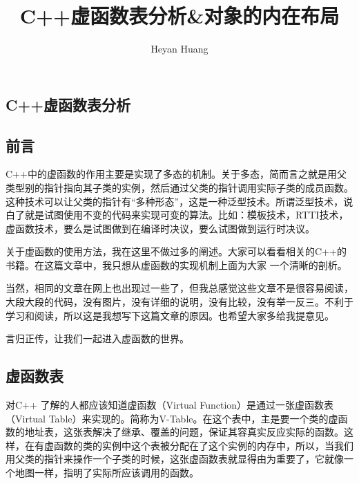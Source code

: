 \documentclass{article}
\title{C++虚函数表分析\&对象的内在布局}
\author{Heyan Huang}
\begin{document}
\begin{CJK}{UTF8}{gbsn}
\maketitle


\small{}

\lstset{language=c++,
numbers=left, 
numberstyle=\tiny, 
escapeinside=``, 
extendedchars=false %
}

\section{C++虚函数表分析}

\subsection{前言}
C++中的虚函数的作用主要是实现了多态的机制。关于多态，简而言之就是用父类型别的指针指向其子类的实例，然后通过父类的指针调用实际子类的成员函数。这种技术可以让父类的指针有“多种形态”，这是一种泛型技术。所谓泛型技术，说白了就是试图使用不变的代码来实现可变的算法。比如：模板技术，RTTI技术，虚函数技术，要么是试图做到在编译时决议，要么试图做到运行时决议。
 
关于虚函数的使用方法，我在这里不做过多的阐述。大家可以看看相关的C++的书籍。在这篇文章中，我只想从虚函数的实现机制上面为大家 一个清晰的剖析。
 
当然，相同的文章在网上也出现过一些了，但我总感觉这些文章不是很容易阅读，大段大段的代码，没有图片，没有详细的说明，没有比较，没有举一反三。不利于学习和阅读，所以这是我想写下这篇文章的原因。也希望大家多给我提意见。
 
言归正传，让我们一起进入虚函数的世界。

\subsection{虚函数表}
对C++ 了解的人都应该知道虚函数（Virtual Function）是通过一张虚函数表（Virtual Table）来实现的。简称为V-Table。在这个表中，主是要一个类的虚函数的地址表，这张表解决了继承、覆盖的问题，保证其容真实反应实际的函数。这样，在有虚函数的类的实例中这个表被分配在了这个实例的内存中，所以，当我们用父类的指针来操作一个子类的时候，这张虚函数表就显得由为重要了，它就像一个地图一样，指明了实际所应该调用的函数。
 

\end{CJK}
\end{document}
